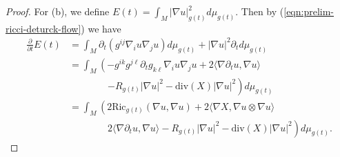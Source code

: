 \documentclass[12pt]{amsart}
\newcommand{\del}{\nabla}
\theoremstyle{remark}
\numberwithin{equation}{section}
\begin{document}
\begin{proof}
    For (b), we define $E(t) = \int_M |\del u|_{g(t)}^2 d\mu_{g(t)}$. Then by (\ref{eqn:prelim-ricci-deturck-flow}) we have
    \begin{align}\label{eqn:scalar-monotonicity-b}
        \frac{\partial}{\partial t} E(t) &= \int_M \partial_t\left(g^{ij}\del_iu\del_ju\right)d\mu_{g(t)} + |\del u|^2\partial_td\mu_{g(t)} \nonumber \\
        &= \int_M \left(-g^{ik}g^{j\ell}\partial_t g_{k\ell}\del_iu\del_ju + 2\langle\del\partial_tu,\del u\rangle \right. \nonumber \\
        &\qquad\qquad \left. - R_{g(t)}|\del u|^2 - \text{div}(X)|\del u|^2\right)d\mu_{g(t)} \nonumber \\
        &= \int_M \left(2\text{Ric}_{g(t)}(\del u,\del u) + 2\langle\del X, \del u\otimes\del u\rangle \right. \nonumber \\
        &\qquad\qquad \left. 2\langle\del\partial_tu,\del u\rangle - R_{g(t)}|\del u|^2 - \text{div}(X)|\del u|^2\right)d\mu_{g(t)}.
    \end{align}


\end{proof}
\end{document}
